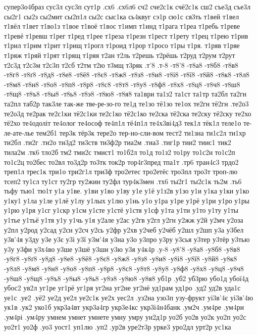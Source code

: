 {{супер3о4браз
сус3л
сус3п
сут1р
.сх6
.сх6л6
сч2
сче2с1к
счё2с1к
сш2
съе3д
съе3л
сы2г1
сы2з
сы2мит
сы2п1л
сы2с
сыс1ка
сь4квуг
сэ1р
сю1с
ся3ть
т1вей
т1вел
т1вёл
т1вет
т1во1з
т1вое
т1воё
т1вос
т1имп
т1инд
т1рага
т1реа
т1ребь
т1реве
т1ревё
т1ревш
т1рег
т1ред
т1рее
т1реза
т1резн
т1рест
т1рету
т1рец
т1рею
т1рив
т1рил
т1рим
т1рит
т1рищ
т1рогл
т1роид
т1рор
т1росо
т1ры
т1ря.
т1ряв
т1ряе
т1ряж
т1ряй
т1рят
т1рящ
т1ряя
т2ан
т2ль
т2решь
т2рёшь
т2руд
т2рум
т2рут
т2с3д
т2с3м
т2с3п
т2сб
т2тм
т2ю
т3мщ
т3ряк
.т'8
.т-8
-т8'8
-т8а8
-т8б8
-т8в8
-т8г8
-т8ґ8
-т8д8
-т8е8
-т8ё8
-т8є8
-т8ж8
-т8з8
-т8и8
-т8і8
-т8ї8
-т8й8
-т8к8
-т8л8
-т8м8
-т8н8
-т8о8
-т8п8
-т8р8
-т8с8
-т8т8
-т8у8
-т8ф8
-т8х8
-т8ц8
-т8ч8
-т8ш8
-т8щ8
-т8ъ8
-т8ы8
-т8ь8
-т8э8
-т8ю8
-т8я8
та1ври
та1з2
та1ст
та1тр
та2бл
та2гн
та2пл
таб2р
так3ле
так-же
тве-ре-зо-го
те1д
те1зо
тё1зо
те1ох
те2гн
тё2гн
.те2о3
те2о3д
те2рак
те2с1ки
тё2с1ки
те2с1ко
тё2с1ко
те2ска
тё2ска
те2ску
тё2ску
те2хо
тё2хо
те4одоліт
те4олог
те4ософ
те4п1л
тё4п1л
те4х3ві4д3
тек1л
тёк1л
теле1о
те-ле-ате-лье
тем2б1
тер3к
тёр3к
тере2о
тер-но-сли-вом
тест2
ти1зна
ти1с2л
ти1хр
ти2бл
.ти2г
.ти2о
ти3д2
ти3ств
ти3ф2р
тиа2м
.тиа3
.тиг1р
тии2
тиис1
тик2
тила2м
.тк6
тло2б
тм2
тми2с
тмист1
то1б2л
то1д
то1з2
то1ру
то1с2н
то1с2п
то1с2ц
то2бес
то2вл
то3д2р
то3тк
ток2р
тор4г3пред
тпа1т
.тр6
тран4с3
трдо2
треп1л
трес1к
три1о
три2г1л
три3ф
тро2етес
тро2етёс
тро3пл
тро3т
троп-лю
тсеп2
ту1сл
ту1ст
ту2гр
ту2жин
ту2фл
тур4к3мен
.тх6
ты2г1
ты2с1к
ть2м
.ть6
тьфу
тью1
тю1т
у1а
у1ве.
у1ви
у1во
у1ву
у1е
у1ё
у1з2в
у1зо
у1и
у1ка
у1ки
у1ко
у1ку1
у1ла
у1ле
у1лё
у1лу
у1лых
у1лю
у1нь
у1о
у1ра
у1ре
у1рё
у1ри
у1ро
у1ры
у1рю
у1ря
у1сг
у1скр
у1см
у1сте
у1стё
у1стя
у1сф
у1та
у1ти
у1то
у1ту
у1ты
у1тье
у1тьё
у1тя
у1у
у1чь
у1я
у2але
у2ас
у2гв
у2гл
у2гн
у2жж
у2й
у2мч
у2оза
у2пл
у2род
у2сад
у2сн
у2сч
у2сь
у2фр
у2хв
у2чеб
у2чёб
у2шл
у2шп
у3а
у3бел
у3в'4я
у3ду
у3е
у3є
у3і
у3ї
у3м'4я
у3на
у3о
у3про
у3ру
у3сья
у3тер
у3тёр
у3тью
у3у
у3фи
у3х4во
у3ше
у3шё
у3ши
у3ю
у3я
у4к4р
.у-8
-у8'8
-у8а8
-у8б8
-у8в8
-у8г8
-у8ґ8
-у8д8
-у8е8
-у8ё8
-у8є8
-у8ж8
-у8з8
-у8и8
-у8і8
-у8ї8
-у8й8
-у8к8
-у8л8
-у8м8
-у8н8
-у8о8
-у8п8
-у8р8
-у8с8
-у8т8
-у8у8
-у8ф8
-у8х8
-у8ц8
-у8ч8
-у8ш8
-у8щ8
-у8ъ8
-у8ы8
-у8ь8
-у8э8
-у8ю8
-у8я8
уб1р
.уб2
уб3рю
убо1д
убої4д
убос2
ув2л
уг1ре
уг1рё
уг1ря
уг2на
уг2не
уг2нё
уд1рам
уд1ро
.уд2
уд2в
уда1с
уе1с
.уе2
.уё2
уе2д
уе2л
уе2с1к
уе2х
уес2л
.уз2на
узо3п
узу-фрукт
уі3в'4є
уі3в'4ю
ук1в
.ук2
уко1б
укр3а4вт
укр3а4гр
укр3е4кс
укр3і4н4банк
.ум2ч
.ум4ре
.ум4ри
.ум4рі
.ум4ру
умнем
умнет
умнете
умну
умру
ун2д1р
уо2б
уо2в
уо2к
уо2п
уо2с
уо2т1
уо2ф
.уо3
уост1
уп1лю
.уп2
.ур2в
уре2т3р
урке3
уро2дл
урт2р
ус1ка
}}
